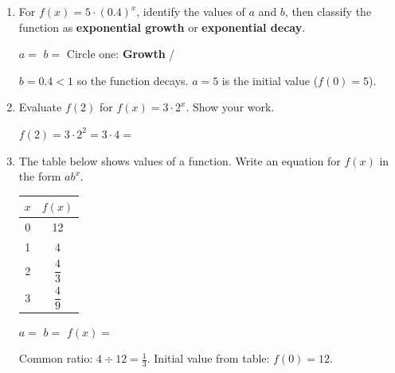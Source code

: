 \documentclass[10pt]{article}
\begin{document}
\namedateperiod

\vspace{0.14in}

\begin{enumerate}[itemsep=16pt]

\item For $f(x) = 5 \cdot (0.4)^x$, identify the values of $a$ and $b$, then classify the
      function as \textbf{exponential growth} or \textbf{exponential decay}.

      \vspace{0.06in}
      $a = $  \quad $b = $  \quad Circle one: \textbf{Growth} \;/\; 

      \begin{teachernote}
        $b = 0.4 < 1$ so the function decays. $a = 5$ is the initial value ($f(0) = 5$).
      \end{teachernote}

\item Evaluate $f(2)$ for $f(x) = 3 \cdot 2^x$. Show your work.

      \vspace{0.06in}
      $f(2) = 3 \cdot 2^2 = 3 \cdot 4 = $ 

\item The table below shows values of a function. Write an equation for $f(x)$ in the form
      $ab^x$.

      \vspace{0.08in}
      \begin{center}
      \renewcommand{\arraystretch}{1.4}
      \begin{tabular}{|c|c|}
        \hline
        $x$ & $f(x)$ \\
        \hline
        0 & 12 \\
        1 & 4 \\
        2 & $\dfrac{4}{3}$ \\
        3 & $\dfrac{4}{9}$ \\
        \hline
      \end{tabular}
      \end{center}

      \vspace{0.06in}
      $a = $  \quad $b = $  \quad $f(x) = $ 

      \begin{teachernote}
        Common ratio: $4 \div 12 = \tfrac{1}{3}$. Initial value from table: $f(0) = 12$.
      \end{teachernote}

\end{enumerate}
\end{document}
